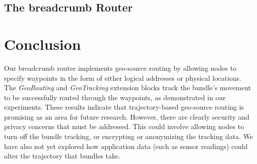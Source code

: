 \documentclass{sig-alternate}
\begin{document}






\subsection{The {\sc\large breadcrumb} Router}



%
%




%
%
\section{Conclusion}

Our {\sc breadcrumb} router implements geo-source routing by allowing nodes to specify waypoints in the form of either logical addresses or physical locations. The {\em GeoRouting} and {\em GeoTracking} extension blocks track the bundle's movement to be successfully routed through the waypoints, as demonstrated in our experiments. These results indicate that trajectory-based geo-source routing is promising as an area for future research. However, there are clearly security and privacy concerns that must be addressed. This could involve allowing nodes to turn off the bundle tracking, or encrypting or anonymizing the tracking data. We have also not yet explored how application data (such as sensor readings) could alter the trajectory that bundles take.


\end{document}

